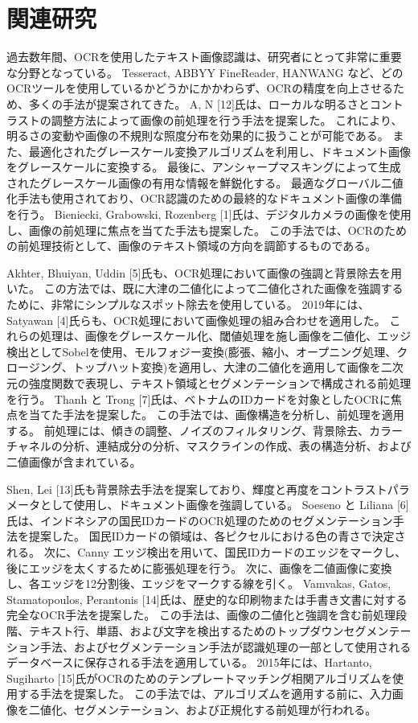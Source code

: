 \documentclass[uplatex, twocolumn,10pt]{jsarticle}
\begin{document}
\section{関連研究}
過去数年間、OCRを使用したテキスト画像認識は、研究者にとって非常に重要な分野となっている。
Tesseract, ABBYY FineReader, HANWANG など、どのOCRツールを使用しているかどうかにかかわらず、OCRの精度を向上させるため、多くの手法が提案されてきた。
A, N [12]氏は、ローカルな明るさとコントラストの調整方法によって画像の前処理を行う手法を提案した。
これにより、明るさの変動や画像の不規則な照度分布を効果的に扱うことが可能である。
また、最適化されたグレースケール変換アルゴリズムを利用し、ドキュメント画像をグレースケールに変換する。
最後に、アンシャープマスキングによって生成されたグレースケール画像の有用な情報を鮮鋭化する。
最適なグローバル二値化手法も使用されており、OCR認識のための最終的なドキュメント画像の準備を行う。
Bieniecki, Grabowski, Rozenberg [1]氏は、デジタルカメラの画像を使用し、画像の前処理に焦点を当てた手法も提案した。
この手法では、OCRのための前処理技術として、画像のテキスト領域の方向を調節するものである。

Akhter, Bhuiyan, Uddin [5]氏も、OCR処理において画像の強調と背景除去を用いた。
この方法では、既に大津の二値化によって二値化された画像を強調するために、非常にシンプルなスポット除去を使用している。
2019年には、Satyawan [4]氏らも、OCR処理において画像処理の組み合わせを適用した。
これらの処理は、画像をグレースケール化、閾値処理を施し画像を二値化、エッジ検出としてSobelを使用、モルフォジー変換(膨張、縮小、オープニング処理、クロージング、トップハット変換)を適用し、大津の二値化を適用して画像を二次元の強度関数で表現し、テキスト領域とセグメンテーションで構成される前処理を行う。
Thanh と Trong [7]氏は、ベトナムのIDカードを対象としたOCRに焦点を当てた手法を提案した。
この手法では、画像構造を分析し、前処理を適用する。
前処理には、傾きの調整、ノイズのフィルタリング、背景除去、カラーチャネルの分析、連結成分の分析、マスクラインの作成、表の構造分析、および二値画像が含まれている。

Shen, Lei [13]氏も背景除去手法を提案しており、輝度と再度をコントラストパラメータとして使用し、ドキュメント画像を強調している。
Soeseno と Liliana [6]氏は、インドネシアの国民IDカードのOCR処理のためのセグメンテーション手法を提案した。
国民IDカードの領域は、各ピクセルにおける色の青さで決定される。
次に、Canny エッジ検出を用いて、国民IDカードのエッジをマークし、後にエッジを太くするために膨張処理を行う。
次に、画像を二値画像に変換し、各エッジを12分割後、エッジをマークする線を引く。
Vamvakas, Gatos, Stamatopoulos, Perantonis [14]氏は、歴史的な印刷物または手書き文書に対する完全なOCR手法を提案した。
この手法は、画像の二値化と強調を含む前処理段階、テキスト行、単語、および文字を検出するためのトップダウンセグメンテーション手法、およびセグメンテーション手法が認識処理の一部として使用されるデータベースに保存される手法を適用している。
2015年には、Hartanto, Sugiharto [15]氏がOCRのためのテンプレートマッチング相関アルゴリズムを使用する手法を提案した。
この手法では、アルゴリズムを適用する前に、入力画像を二値化、セグメンテーション、および正規化する前処理が行われる。
\end{document}
